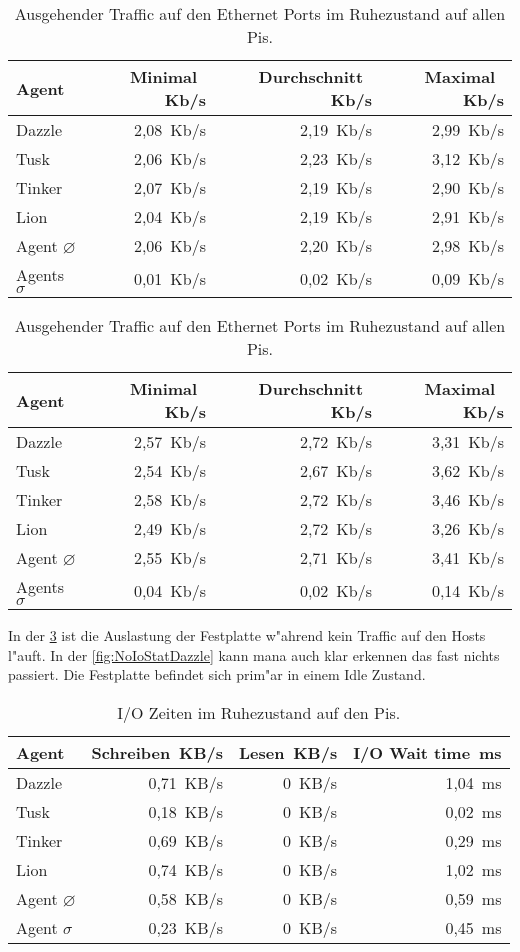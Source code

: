 \begin{table}
\centering
\begin{tabular}{l%
 r<{\,Kb/s}%
 r<{\,Kb/s}%
 r<{\,Kb/s}%
}
Agent  				& Minimal		& Durchschnitt		& Maximal	\\
\hline
Dazzle 				& 2,08			& 2,19 			& 2,99		\\
Tusk 				& 2,06			& 2,23			& 3,12		\\
Tinker				& 2,07			& 2,19			& 2,90		\\
Lion				& 2,04			& 2,19			& 2,91		\\ 
Agent $\diameter $	 	& 2,06			& 2,20			& 2,98		\\   
Agents $\sigma $		& 0,01			& 0,02			& 0,09		\\

\end{tabular}
\caption{Eingehender Traffic auf den Ethernet Ports im Ruhezustand auf allen Pis.}
\label{tab:noTrafficIn}
\begin{tabular}{l%
 r<{\,Kb/s}%
 r<{\,Kb/s}%
 r<{\,Kb/s}%
}
Agent  				& Minimal		& Durchschnitt		& Maximal	\\	
\hline
Dazzle 				& 2,57			& 2,72	 		& 3,31		\\
Tusk 				& 2,54			& 2,67			& 3,62		\\
Tinker				& 2,58			& 2,72			& 3,46		\\
Lion				& 2,49			& 2,72			& 3,26		\\ 
Agent $\diameter $	 	& 2,55			& 2,71			& 3,41		\\   
Agents $\sigma $		& 0,04			& 0,02			& 0,14		\\

\end{tabular}
\caption{Ausgehender Traffic auf den Ethernet Ports im Ruhezustand auf allen Pis.}
\label{tab:noTrafficOut} 
\end{table}


In der \cref{tab:NoTrafficIoStat} ist die Auslastung der Festplatte w"ahrend kein Traffic %
auf den Hosts l"auft. In der \cref{fig:NoIoStatDazzle} kann mana auch klar erkennen %
das fast nichts passiert. Die Festplatte befindet sich prim"ar in einem Idle Zustand.

\begin{table}
\centering
\begin{tabular}{l%
 r<{\,KB/s}%
 r<{\,KB/s}%
 r<{\,ms}%
}
Agent	  			& Schreiben	 	& Lesen			& I/O Wait time 		\\	
\hline
Dazzle 				& 0,71			& 0			& 1,04	        \\
Tusk 				& 0,18			& 0			& 0,02			\\
Tinker				& 0,69 			& 0			& 0,29		 	\\
Lion				& 0,74			& 0			& 1,02	 	\\
Agent $\diameter $  		& 0,58			& 0			& 0,59		\\   
Agent $\sigma $ 		& 0,23  		& 0			& 0,45		\\
\end{tabular}
\caption{I/O Zeiten im Ruhezustand auf den Pis.}
\label{tab:NoTrafficIoStat}
\end{table}


